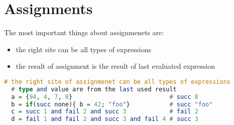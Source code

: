 \chapter{Assignments}

The most important things about assignmenets are:
\begin{itemize}
  \item the right site can be all types of expressions
  \item the result of assignment is the result of last evaluated expression
\end{itemize}

\begin{lstlisting}[language=haskell]
  # the right site of assignmenet can be all types of expressions
  # type and value are from the last used result
  a = {94, 4, 7, 8}                           # succ 8
  b = if(succ none){ b = 42; "foo"}           # succ "foo"
  c = succ 1 and fail 2 and succ 3            # fail 2 
  d = fail 1 and fail 2 and succ 3 and fail 4 # succ 3
\end{lstlisting}
